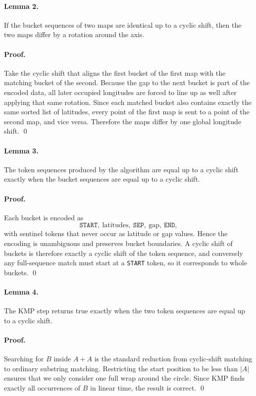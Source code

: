 \documentclass[11pt]{article}
\begin{document}
\paragraph{Lemma 2.}
If the bucket sequences of two maps are identical up to a cyclic shift, then the two maps differ by a
rotation around the axis.

\paragraph{Proof.}
Take the cyclic shift that aligns the first bucket of the first map with the matching bucket of the second.
Because the gap to the next bucket is part of the encoded data, all later occupied longitudes are forced to
line up as well after applying that same rotation. Since each matched bucket also contains exactly the same
sorted list of latitudes, every point of the first map is sent to a point of the second map, and vice versa.
Therefore the maps differ by one global longitude shift. \qed

\paragraph{Lemma 3.}
The token sequences produced by the algorithm are equal up to a cyclic shift exactly when the bucket
sequences are equal up to a cyclic shift.

\paragraph{Proof.}
Each bucket is encoded as
\[
    \texttt{START},\ \text{latitudes},\ \texttt{SEP},\ \text{gap},\ \texttt{END},
\]
with sentinel tokens that never occur as latitude or gap values. Hence the encoding is unambiguous and
preserves bucket boundaries. A cyclic shift of buckets is therefore exactly a cyclic shift of the token
sequence, and conversely any full-sequence match must start at a \texttt{START} token, so it corresponds to
whole buckets. \qed

\paragraph{Lemma 4.}
The KMP step returns true exactly when the two token sequences are equal up to a cyclic shift.

\paragraph{Proof.}
Searching for $B$ inside $A+A$ is the standard reduction from cyclic-shift matching to ordinary substring
matching. Restricting the start position to be less than $|A|$ ensures that we only consider one full wrap
around the circle. Since KMP finds exactly all occurrences of $B$ in linear time, the result is correct. \qed
\end{document}
